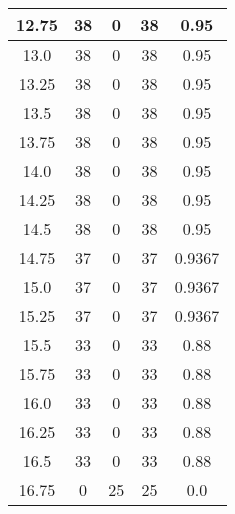 \documentclass[letterpaper, 12pt]{article}
\begin{document}
\begin{longtable}{|c|c|c|c|c|}
\hline
12.75 & 38 & 0 & 38 & 0.95 \\
\hline
13.0 & 38 & 0 & 38 & 0.95 \\
\hline
13.25 & 38 & 0 & 38 & 0.95 \\
\hline
13.5 & 38 & 0 & 38 & 0.95 \\
\hline
13.75 & 38 & 0 & 38 & 0.95 \\
\hline
14.0 & 38 & 0 & 38 & 0.95 \\
\hline
14.25 & 38 & 0 & 38 & 0.95 \\
\hline
14.5 & 38 & 0 & 38 & 0.95 \\
\hline
14.75 & 37 & 0 & 37 & 0.9367 \\
\hline
15.0 & 37 & 0 & 37 & 0.9367 \\
\hline
15.25 & 37 & 0 & 37 & 0.9367 \\
\hline
15.5 & 33 & 0 & 33 & 0.88 \\
\hline
15.75 & 33 & 0 & 33 & 0.88 \\
\hline
16.0 & 33 & 0 & 33 & 0.88 \\
\hline
16.25 & 33 & 0 & 33 & 0.88 \\
\hline
16.5 & 33 & 0 & 33 & 0.88 \\
\hline
16.75 & 0 & 25 & 25 & 0.0 \\
\hline
\end{longtable}
\end{document}
